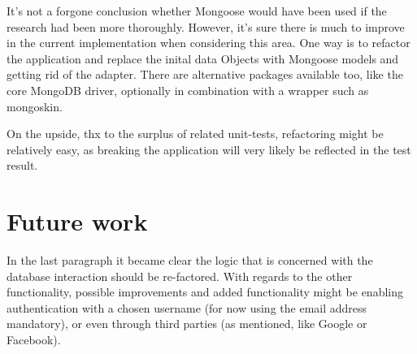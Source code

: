 It's not a forgone conclusion whether Mongoose would have been used if the
research had been more thoroughly. However, it's sure there is much to improve
in the current implementation when considering this area. One way is to refactor
the application and replace the inital data Objects with Mongoose models and
getting rid of the adapter. There are alternative packages available too, like 
the core MongoDB driver, optionally in combination with a wrapper such as 
mongoskin. 

On the upside, thx to the surplus of related unit-tests, refactoring might be 
relatively easy, as breaking the application will very likely be reflected in 
the test result.

\section{Future work}
In the last paragraph it became clear the logic that is concerned with the 
database interaction should be re-factored. With regards to the other 
functionality, possible improvements and added functionality might be enabling
authentication with a chosen username (for now using the email address 
mandatory), or even through third parties 
(as mentioned, like Google or Facebook).

